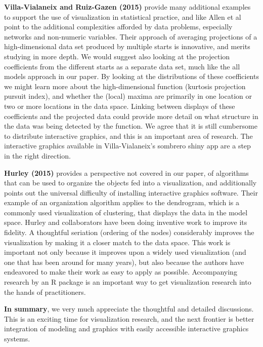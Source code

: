 \documentclass[preprint]{imsart}
\begin{document}
\textbf{Villa-Vialaneix and Ruiz-Gazen (2015)} provide many additional examples to support the use of visualization in statistical practice, and like Allen et al point to the additional complexities afforded by data problems, especially networks and non-numeric variables. Their approach of averaging projections of a high-dimensional data set produced by multiple starts is innovative, and merits studying in more depth. We would suggest also looking at the projection coefficients from the different starts as a separate data set, much like the all models approach in our paper. By looking at the distributions of these coefficients we might learn more about the high-dimensional function (kurtosis projection pursuit index), and whether the (local) maxima are primarily in one location or two or more locations in the data space. Linking between displays of these coefficients and the projected data could provide more detail on what structure in the data was being detected by the function. We agree that it is still cumbersome to distribute interactive graphics, and this is an important area of research. The interactive graphics available in Villa-Vialaneix's sombrero shiny app are a step in the right direction.


\textbf{Hurley (2015)} provides a perspective not covered in our paper, of algorithms that can be used to organize the objects fed into a visualization, and additionally points out the universal difficulty of installing interactive graphics software. Their example of an organization algorithm applies to the dendrogram, which is a commonly used visualization of clustering, that displays the data in the model space. Hurley and collaborators have been doing inventive work to improve its fidelity. A thoughtful seriation (ordering of the nodes) considerably improves the visualization by making it a closer match to the data space. This work is important not only because it improves upon a widely used visualization (and one that has been around for many years), but also because the authors have endeavored to make their work as easy to apply as possible. Accompanying research by an R package is an important way to get visualization research into the hands of practitioners.


\textbf{In summary}, we very much appreciate the thoughtful and detailed discussions. This is an exciting time for visualization research, and the next frontier is better integration of modeling and graphics with easily accessible interactive graphics systems.
\end{document}
